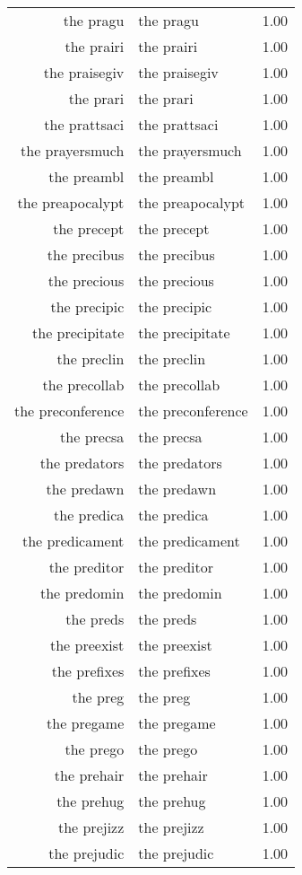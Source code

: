 \begin{table}[ht]
\begin{tabular}{rlr}
  the pragu & the pragu & 1.00 \\ 
  the prairi & the prairi & 1.00 \\ 
  the praisegiv & the praisegiv & 1.00 \\ 
  the prari & the prari & 1.00 \\ 
  the prattsaci & the prattsaci & 1.00 \\ 
  the prayersmuch & the prayersmuch & 1.00 \\ 
  the preambl & the preambl & 1.00 \\ 
  the preapocalypt & the preapocalypt & 1.00 \\ 
  the precept & the precept & 1.00 \\ 
  the precibus & the precibus & 1.00 \\ 
  the precious & the precious & 1.00 \\ 
  the precipic & the precipic & 1.00 \\ 
  the precipitate & the precipitate & 1.00 \\ 
  the preclin & the preclin & 1.00 \\ 
  the precollab & the precollab & 1.00 \\ 
  the preconference & the preconference & 1.00 \\ 
  the precsa & the precsa & 1.00 \\ 
  the predators & the predators & 1.00 \\ 
  the predawn & the predawn & 1.00 \\ 
  the predica & the predica & 1.00 \\ 
  the predicament & the predicament & 1.00 \\ 
  the preditor & the preditor & 1.00 \\ 
  the predomin & the predomin & 1.00 \\ 
  the preds & the preds & 1.00 \\ 
  the preexist & the preexist & 1.00 \\ 
  the prefixes & the prefixes & 1.00 \\ 
  the preg & the preg & 1.00 \\ 
  the pregame & the pregame & 1.00 \\ 
  the prego & the prego & 1.00 \\ 
  the prehair & the prehair & 1.00 \\ 
  the prehug & the prehug & 1.00 \\ 
  the prejizz & the prejizz & 1.00 \\ 
  the prejudic & the prejudic & 1.00 \\ 

\end{tabular}
\end{table}
